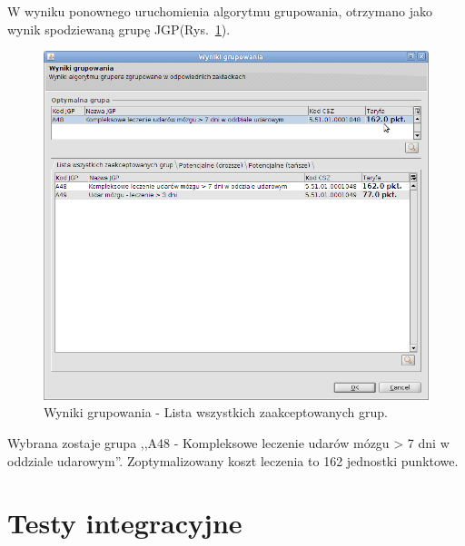 W wyniku ponownego uruchomienia algorytmu grupowania, otrzymano jako wynik spodziewaną grupę JGP(Rys.~\ref{img:gruper15}).

\begin{figure}%
\centering
\includegraphics[scale=0.4]{images/gruper15}
\caption[Widok grupera]{Wyniki grupowania - Lista wszystkich zaakceptowanych grup.}
\label{img:gruper15}
\end{figure}

Wybrana zostaje grupa ,,A48 - Kompleksowe leczenie udarów mózgu > 7 dni w oddziale udarowym''. Zoptymalizowany koszt leczenia to 162 jednostki punktowe.


\section{Testy integracyjne}
\label{sec:testyIntegracyjne}

